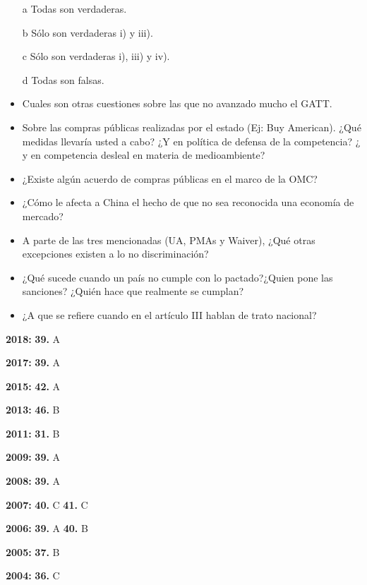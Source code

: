 \documentclass{nuevotema}
\begin{document}
\begin{itemize}
	\item[a] Todas son verdaderas.
	\item[b] Sólo son verdaderas i) y iii).
	\item[c] Sólo son verdaderas i), iii) y iv).
	\item[d] Todas son falsas.
\end{itemize}



\begin{itemize}
    \item Cuales son otras cuestiones sobre las que no avanzado mucho el GATT.
    \item Sobre las compras públicas realizadas por el estado (Ej: Buy American). ¿Qué medidas llevaría usted a cabo? ¿Y en política de defensa de la competencia? ¿ y en competencia desleal en materia de medioambiente?
    \item ¿Existe algún acuerdo de compras públicas en el marco de la OMC?
    \item ¿Cómo le afecta a China el hecho de que no sea reconocida una economía de mercado?
    \item A parte de las tres mencionadas (UA, PMAs y Waiver), ¿Qué otras excepciones existen a lo no discriminación?
    \item ¿Qué sucede cuando un país no cumple con lo pactado?¿Quien pone las sanciones? ¿Quién hace que realmente se cumplan?
    \item ¿A que se refiere cuando en el artículo III hablan de trato nacional?
\end{itemize}

\notas

\textbf{2018:} \textbf{39.} A

\textbf{2017:} \textbf{39.} A

\textbf{2015:} \textbf{42.} A

\textbf{2013:} \textbf{46.} B

\textbf{2011:} \textbf{31.} B

\textbf{2009:} \textbf{39.} A

\textbf{2008:} \textbf{39.} A

\textbf{2007:} \textbf{40.} C \textbf{41.} C

\textbf{2006:} \textbf{39.} A \textbf{40.} B

\textbf{2005:} \textbf{37.} B

\textbf{2004:} \textbf{36.} C
\end{document}

